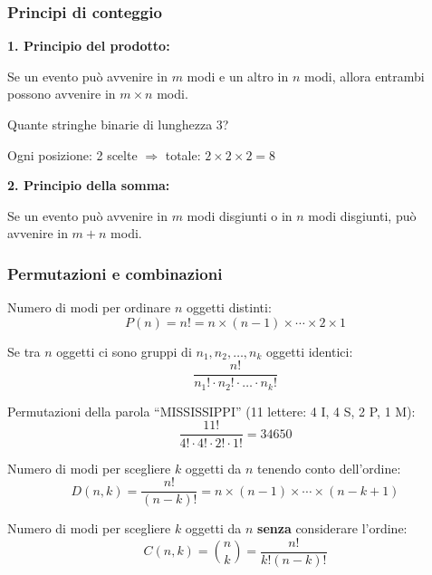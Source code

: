 \subsubsection{Principi di conteggio}

\textbf{1. Principio del prodotto:}

Se un evento può avvenire in $m$ modi e un altro in $n$ modi, allora entrambi possono avvenire in $m \times n$ modi.

\begin{esempio}
	Quante stringhe binarie di lunghezza 3?
	
	Ogni posizione: 2 scelte $\Rightarrow$ totale: $2 \times 2 \times 2 = 8$
\end{esempio}

\textbf{2. Principio della somma:}

Se un evento può avvenire in $m$ modi disgiunti o in $n$ modi disgiunti, può avvenire in $m + n$ modi.

\subsubsection{Permutazioni e combinazioni}

\begin{definizione}[Permutazione]
	Numero di modi per ordinare $n$ oggetti distinti:
	\[
	P(n) = n! = n \times (n-1) \times \cdots \times 2 \times 1
	\]
\end{definizione}

\begin{definizione}
	Se tra $n$ oggetti ci sono gruppi di $n_1, n_2, \ldots, n_k$ oggetti identici:
	\[
	\frac{n!}{n_1! \cdot n_2! \cdot \ldots \cdot n_k!}
	\]
\end{definizione}

\begin{esempio}
	Permutazioni della parola ``MISSISSIPPI'' (11 lettere: 4 I, 4 S, 2 P, 1 M):
	\[
	\frac{11!}{4! \cdot 4! \cdot 2! \cdot 1!} = 34650
	\]
\end{esempio}

\begin{definizione}[Disposizioni]
	Numero di modi per scegliere $k$ oggetti da $n$ tenendo conto dell'ordine:
	\[
	D(n,k) = \frac{n!}{(n-k)!} = n \times (n-1) \times \cdots \times (n-k+1)
	\]
\end{definizione}

\begin{definizione}
	Numero di modi per scegliere $k$ oggetti da $n$ \textbf{senza} considerare l'ordine:
	\[
	C(n,k) = \binom{n}{k} = \frac{n!}{k!(n-k)!}
	\]
\end{definizione}

